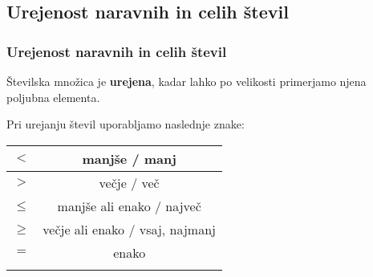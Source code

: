 \subsection{Urejenost naravnih in celih števil}

        \begin{frame}
            \frametitle{Urejenost naravnih in celih števil}

            \begin{alertblock}{}
                Številska množica je \textbf{urejena}, kadar lahko po velikosti primerjamo njena poljubna elementa.
            \end{alertblock}

            \begin{block}{}
                Pri urejanju števil uporabljamo naslednje znake:
                \begin{table}
                    \centering
                    \addtolength{\tabcolsep}{6pt}
                    \renewcommand{\arraystretch}{1.4}                
                    \begin{tabular}{||c|c||} 
                        \hhline{|t:==:t|}
                                $\mathbf{<}$ & manjše / manj  \\ 
                        \hline
                                $\mathbf{>}$ & večje / več   \\ 
                        \hline
                                $\mathbf{\leq}$ & manjše ali enako / največ   \\ 
                        \hline
                                $\mathbf{\geq}$ & večje ali enako / vsaj, najmanj \\  
                        \hline
                                $\mathbf{=}$ & enako \\
                        \hhline{|b:==:b|}
                    \end{tabular}
                \end{table}
            \end{block}
        \end{frame}

